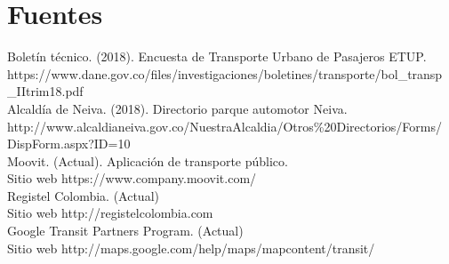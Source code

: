 \documentclass[letterpaper]{twentysecondcv} %
\begin{document}
\section{Fuentes}
Boletín técnico. (2018). Encuesta de Transporte Urbano de Pasajeros ETUP.\\ https://www.dane.gov.co/files/investigaciones/boletines/transporte/bol\_transp \\ \_IItrim18.pdf \\

Alcaldía de Neiva. (2018). Directorio parque automotor Neiva.\\ http://www.alcaldianeiva.gov.co/NuestraAlcaldia/Otros\%20Directorios/Forms/ \\ DispForm.aspx?ID=10 \\

Moovit. (Actual). Aplicación de transporte público.\\ Sitio web 
https://www.company.moovit.com/ \\

Registel Colombia. (Actual)\\ Sitio web http://registelcolombia.com \\

Google Transit Partners Program. (Actual) \\
Sitio web http://maps.google.com/help/maps/mapcontent/transit/
\end{document}
